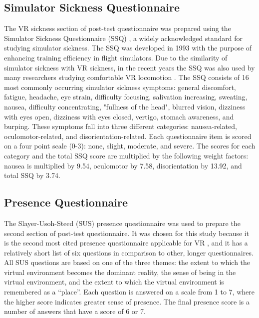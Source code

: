 \subsection{Simulator Sickness Questionnaire}

The VR sickness section of post-test questionnaire was prepared using the Simulator Sickness Questionnaire (SSQ) \cite{SSQ}, a widely acknowledged standard for studying simulator sickness. The SSQ was developed in 1993 with the purpose of enhancing training efficiency in flight simulators. Due to the similarity of simulator sickness with VR sickness, in the recent years the SSQ was also used by many researchers studying comfortable VR locomotion \cite{TELEPORTATIONEFFECTS}\cite{NODEBASEDTELEPORTATION}\cite{SUSMETHODARTICLE}. The SSQ consists of 16 most commonly occurring simulator sickness symptoms: general discomfort, fatigue, headache, eye strain, difficulty focusing, salivation increasing, sweating, nausea, difficulty concentrating, "fullness of the head", blurred vision, dizziness with eyes open, dizziness with eyes closed, vertigo, stomach awareness, and burping. These symptoms fall into three different categories: nausea-related, oculomotor-related, and disorientation-related. Each questionnaire item is scored on a four point scale (0-3): none, slight, moderate, and severe. The scores for each category and the total SSQ score are multiplied by the following weight factors: nausea is multiplied by 9.54, oculomotor by 7.58, disorientation by 13.92, and total SSQ by 3.74.

\subsection{Presence Questionnaire}

The Slayer-Usoh-Steed (SUS) \cite{SUS} presence questionnaire was used to prepare the second section of post-test questionnaire. It was chosen for this study because it is the second most cited presence questionnaire applicable for VR \cite{SUSEVIDENCE}, and it has a relatively short list of six questions in comparison to other, longer questionnaires. All SUS questions are based on one of the three themes: the extent to which the virtual environment becomes the dominant reality, the sense of being in the virtual environment, and the extent to which the virtual environment is remembered as a ``place''. Each question is answered on a scale from 1 to 7, where the higher score indicates greater sense of presence. The final presence score is a number of answers that have a score of 6 or 7.

